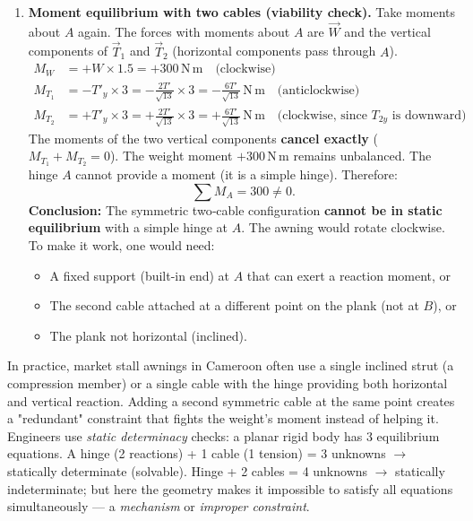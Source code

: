 \documentclass[11pt]{article}
\begin{document}
\begin{enumerate}
    \item \textbf{Moment equilibrium with two cables (viability check).}
    Take moments about $A$ again. The forces with moments about $A$ are $\vec{W}$ and the vertical components of $\vec{T}_1$ and $\vec{T}_2$ (horizontal components pass through $A$).
    \begin{align*}
        M_W &= +W \times 1.5 = +300\,\mathrm{N\,m} \quad\text{(clockwise)} \\
        M_{T_1} &= -T'_y \times 3 = -\frac{2T'}{\sqrt{13}} \times 3 = -\frac{6T'}{\sqrt{13}}\,\mathrm{N\,m} \quad\text{(anticlockwise)} \\
        M_{T_2} &= +T'_y \times 3 = +\frac{2T'}{\sqrt{13}} \times 3 = +\frac{6T'}{\sqrt{13}}\,\mathrm{N\,m} \quad\text{(clockwise, since $T_{2y}$ is downward)}
    \end{align*}
    The moments of the two vertical components \textbf{cancel exactly} ($M_{T_1}+M_{T_2}=0$). The weight moment $+300\,\mathrm{N\,m}$ remains unbalanced. The hinge $A$ cannot provide a moment (it is a simple hinge). Therefore:
    \[
    \sum M_A = 300 \neq 0.
    \]
    \textbf{Conclusion:} The symmetric two‑cable configuration \textbf{cannot be in static equilibrium} with a simple hinge at $A$. The awning would rotate clockwise. To make it work, one would need:
    \begin{itemize}
        \item A fixed support (built-in end) at $A$ that can exert a reaction moment, or
        \item The second cable attached at a different point on the plank (not at $B$), or
        \item The plank not horizontal (inclined).
    \end{itemize}
\end{enumerate}

\begin{savaistu}
In practice, market stall awnings in Cameroon often use a single inclined strut (a compression member) or a single cable with the hinge providing both horizontal and vertical reaction. Adding a second symmetric cable at the same point creates a "redundant" constraint that fights the weight's moment instead of helping it. Engineers use \emph{static determinacy} checks: a planar rigid body has 3 equilibrium equations. A hinge (2 reactions) + 1 cable (1 tension) = 3 unknowns $\rightarrow$ statically determinate (solvable). Hinge + 2 cables = 4 unknowns $\rightarrow$ statically indeterminate; but here the geometry makes it impossible to satisfy all equations simultaneously — a \emph{mechanism} or \emph{improper constraint}.
\end{savaistu}
\end{document}
